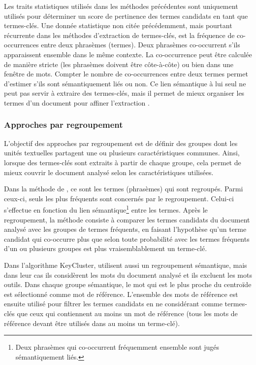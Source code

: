       Les traits statistiques utilisés dans les méthodes précédentes sont
      uniquement utilisés pour déterminer un score de pertinence des termes
      candidats en tant que termes-clés. Une donnée statistique non citée
      précédemment, mais pourtant récurrente dans les méthodes d'extraction de
      termes-clés, est la fréquence de co-occurrences entre deux phrasèmes
      (termes). Deux phrasèmes co-occurrent s'ils apparaissent ensemble dans le
      même contexte. La co-occurrence peut être calculée de manière stricte (les
      phrasèmes doivent être côte-à-côte) ou bien dans une fenêtre de mots.
      Compter le nombre de co-occurrences entre deux termes permet d'estimer
      s'ils sont sémantiquement liés ou non. Ce lien sémantique à lui seul ne
      peut pas servir à extraire des termes-clés, mais il permet de mieux
      organiser les termes d'un document pour affiner l'extraction
      \citep{matsuo2004wordcooccurrence, liu2009keycluster,
      mihalcea2004textrank}.

    \subsubsection{Approches par regroupement}
      L'objectif des approches par regroupement est de définir des groupes dont
      les unités textuelles partagent une ou plusieurs caractéristiques
      communes. Ainsi, lorsque des termes-clés sont extraits à partir de chaque
      groupe, cela permet de mieux couvrir le document analysé selon les
      caractéristiques utilisées.

      Dans la méthode de \citet{matsuo2004wordcooccurrence}, ce sont les termes
      (phrasèmes) qui sont regroupés. Parmi ceux-ci, seuls les plus fréquents
      sont concernés par le regroupement. Celui-ci s'effectue en fonction du
      lien sémantique\footnote{Deux phrasèmes qui co-occurrent fréquemment
      ensemble sont jugés sémantiquement liés.} entre les termes. Après le
      regroupement, la méthode consiste à comparer les termes candidats du
      document analysé avec les groupes de termes fréquents, en faisant
      l'hypothèse qu'un terme candidat qui co-occurre plus que selon toute
      probabilité avec les termes fréquents d'un ou plusieurs groupes est plus
      vraisemblablement un terme-clé.

      Dans l'algorithme KeyCluster,  \citet{liu2009keycluster} utilisent aussi
      un regroupement sémantique, mais dans leur cas ils considèrent les mots du
      document analysé et ils excluent les mots outils. Dans chaque groupe
      sémantique, le mot qui est le plus proche du centroïde est sélectionné
      comme mot de référence. L'ensemble des mots de référence est ensuite
      utilisé pour filtrer les termes candidats en ne considérant comme
      termes-clés que ceux qui contiennent au moins un mot de référence (tous
      les mots de référence devant être utilisés dans au moins un terme-clé).

